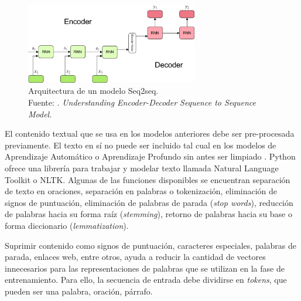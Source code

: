 \begin{itemize}
	\begin{figure}[!ht]
		\begin{center}
			\includegraphics[width=0.67\textwidth]{2/figures/encoder-decoder.jpeg}
			\caption[Arquitectura de un modelo Seq2seq]{Arquitectura de un modelo Seq2seq.\\
			Fuente: \cite{tec_kostadinov2019seq2seq}. \textit{Understanding Encoder-Decoder Sequence to Sequence Model}.}
			\label{2:fig46}
		\end{center}
	\end{figure}	
\end{itemize}

\newpage
El contenido textual que se usa en los modelos anteriores debe ser pre-procesada previamente. El texto en sí no puede ser incluido tal cual en los modelos de Aprendizaje Automático o Aprendizaje Profundo sin antes ser limpiado \parencite{bk_brownlee2017deeplearning_nlp}. Python ofrece una librería para trabajar y modelar texto llamada Natural Language Toolkit o NLTK. Algunas de las funciones disponibles se encuentran separación de texto en oraciones, separación en palabras o tokenización, eliminación de signos de puntuación, eliminación de palabras de parada (\textit{stop words}), reducción de palabras hacia su forma raíz (\textit{stemming}), retorno de palabras hacia su base o forma diccionario (\textit{lemmatization}).

Suprimir contenido como signos de puntuación, caracteres especiales, palabras de parada, enlaces web, entre otros, ayuda a reducir la cantidad de vectores innecesarios para las representaciones de palabras que se utilizan en la fase de entrenamiento. Para ello, la secuencia de entrada debe dividirse en \textit{tokens}, que pueden ser una palabra, oración, párrafo.

